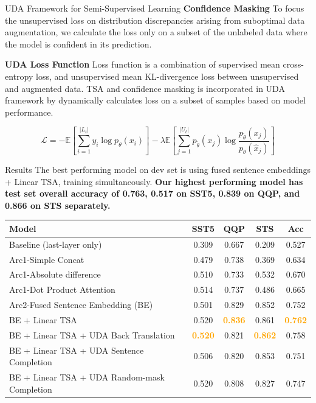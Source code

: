 \documentclass[final]{beamer}
\newlength{\colwidth}
\begin{document}
\begin{frame}[t]
\begin{columns}[t]
\begin{column}{\colwidth}
\begin{block}{UDA Framework for Semi-Supervised Learning}
        \textbf{Confidence Masking} To focus the unsupervised loss on distribution discrepancies arising from suboptimal data augmentation, we calculate the loss only on a subset of the unlabeled data where the model is confident in its prediction.

        \textbf{UDA Loss Function}
        Loss function is a combination of 
        supervised mean cross-entropy loss,
        and unsupervised mean KL-divergence loss between unsupervised and 
        augmented data.
        TSA and confidence masking is incorporated in UDA framework by dynamically 
        calculates loss on a subset of samples based on model performance.
        
        $$\mathcal{L} = 
        - \mathbb{E} \left[ \sum_{i=1}^{|L_t|} y_i \log p_{\theta}(x_i) \right]
        - \lambda \mathbb{E} \left[ \sum_{j=1}^{|U_t|} p_{\tilde{\theta}}(x_j) \log 
        \frac{p_{\tilde{\theta}}(x_j)}{p_{\theta}(\hat x_j)} \right]
        $$
    
    \end{block}

  \begin{block}{Results}
    The best performing model on dev set is using fused sentence embeddings +
    Linear TSA, training simultaneously. 
    \textbf{Our highest performing model has test set overall accuracy of 0.763, 
    0.517 on SST5, 0.839 on QQP, and 0.866 on STS separately.}
    \begin{table}[H]
      \centering
      \label{tab:baseline_ext}
      \begin{tabular}{@{}lcccc@{}}
        \toprule
        \textbf{Model} & \multicolumn{1}{c}{\textbf{SST5}} & \multicolumn{1}{c}{\textbf{QQP}} & \multicolumn{1}{c}{\textbf{STS}} & \multicolumn{1}{c}{\textbf{Acc}} \\ \midrule
        Baseline (last-layer only) & 0.309 & 0.667 & 0.209 & 0.527 \\
        Arc1-Simple Concat & 0.479 & 0.738 & 0.369 & 0.634 \\
        Arc1-Absolute difference & 0.510 & 0.733 & 0.532 & 0.670 \\
        Arc1-Dot Product Attention & 0.514 & 0.737 & 0.486 & 0.665 \\
        Arc2-Fused Sentence Embedding (BE) & 0.501 & 0.829 & 0.852 & 0.752 \\
        BE + Linear TSA & 0.520 & \textcolor{orange}{\textbf{0.836}} & 0.861 & \textcolor{orange}{\textbf{0.762}} \\
        BE + Linear TSA + UDA Back Translation & \textcolor{orange}{\textbf{0.520}} & 0.821 & \textcolor{orange}{\textbf{0.862}} & 0.758 \\
        BE + Linear TSA + UDA Sentence Completion & 0.506 & 0.820 & 0.853 & 0.751 \\
        BE + Linear TSA + UDA Random-mask Completion & 0.520 & 0.808 & 0.827 & 0.747 \\ 
        \bottomrule
      \end{tabular}
    \end{table}



\end{block}
\end{column}
\end{columns}
\end{frame}
\end{document}
